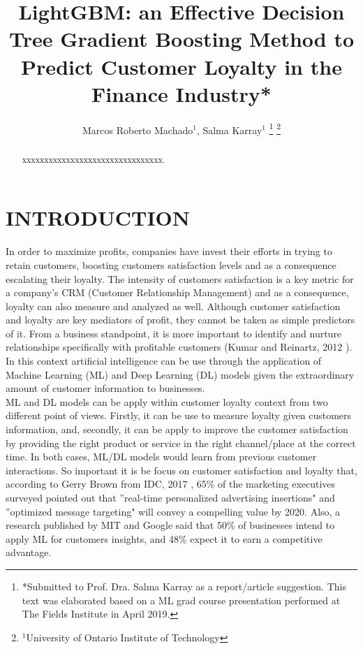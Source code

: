 \documentclass[letterpaper, 10 pt, conference]{ieeeconf}  %
\title{\LARGE \bf
LightGBM: an Effective Decision Tree Gradient Boosting Method to Predict Customer Loyalty in the Finance Industry*
}
\author{Marcos Roberto Machado$^{1}$, Salma Karray$^{1}$ %
\thanks{*Submitted to Prof. Dra. Salma Karray as a report/article suggestion. This text was elaborated based on a ML grad course presentation performed at The Fields Institute in April 2019.}%
\thanks{$^{1}$University of Ontario Institute of Technology}
}
\begin{document}
\maketitle
\thispagestyle{empty}
\pagestyle{empty}


\begin{abstract}
xxxxxxxxxxxxxxxxxxxxxxxxxxxxxxxx.
\end{abstract}


\section{INTRODUCTION}
In order to maximize profits, companies have invest their efforts in trying to retain customers, boosting customers satisfaction levels and as a consequence escalating their loyalty. The intensity of customers satisfaction is a key metric for a company's CRM (Customer Relationship Management) and as a consequence, loyalty can also measure and analyzed as well. Although customer satisfaction and loyalty are key mediators of profit, they cannot be taken as simple predictors of it. From a business standpoint, it is more important to identify and nurture relationships specifically with profitable customers (Kumar and Reinartz, 2012 \cite{Kumar2012}). In this context artificial intelligence can be use through the application of Machine Learning (ML) and Deep Learning (DL) models given the extraordinary amount of customer information to businesses.\\

ML and DL models can be apply within customer loyalty context from two different point of views. Firstly, it can be use to measure loyalty given customers information, and, secondly, it can be apply to improve the customer satisfaction by providing the right product or service in the right channel/place at the correct time. In both cases, ML/DL models would learn from previous customer interactions. So important it is be focus on customer satisfaction and loyalty that, according to Gerry Brown from IDC, 2017 \cite{IDC2017}, 65\% of the marketing executives surveyed pointed out that ''real-time personalized advertising insertions" and ''optimized message targeting" will convey a compelling value by 2020. Also, a research published by MIT and Google said that 50\% of businesses intend to apply ML for customers insights, and 48\% expect it to earn a competitive advantage. \\ 
\end{document}
